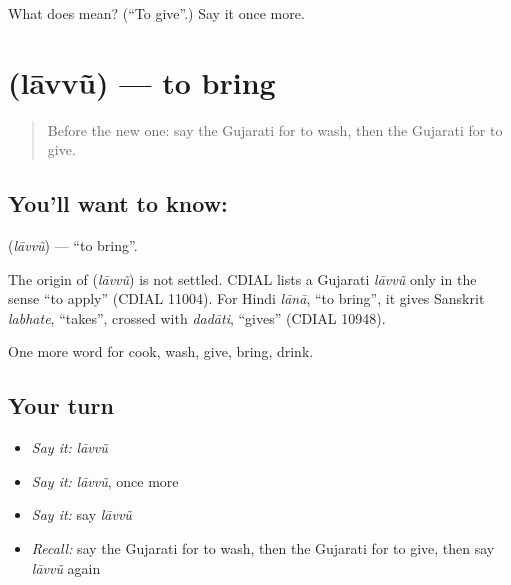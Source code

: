 \begin{tcolorbox}[breakable,colback=teal!4,colframe=teal!35!black,title={Before you move on}]
What does  mean? (\textquotedblleft{}To give\textquotedblright{}.) Say it once more.
\end{tcolorbox}
\section[\texorpdfstring{\gu{લાવવું} (lāvvũ)}{લાવવું (lāvvũ)}]{ (lāvvũ) — to bring}

\label{lesson:GU-C55-laavvu}



\begin{quote}
Before the new one: say the Gujarati for to wash, then the Gujarati for to give.
\end{quote}

\subsection*{You'll want to know: }
\textbf{} (\emph{lāvvũ}) — \textquotedblleft{}to bring\textquotedblright{}.

\begin{cousinweb}
The origin of \textbf{} (\emph{lāvvũ}) is not settled. CDIAL lists a Gujarati \emph{lāvvũ} only in the sense \textquotedblleft{}to apply\textquotedblright{} (CDIAL 11004). For Hindi \emph{lānā}, \textquotedblleft{}to bring\textquotedblright{}, it gives Sanskrit \emph{labhate}, \textquotedblleft{}takes\textquotedblright{}, crossed with \emph{dadāti}, \textquotedblleft{}gives\textquotedblright{} (CDIAL 10948).
\end{cousinweb}

\begin{grammarlens}[title={What you've built}]
One more word for cook, wash, give, bring, drink.
\end{grammarlens}

\subsection*{Your turn}
\begin{itemize}
\raggedright
  \item \emph{Say it:} \emph{lāvvũ}
  \item \emph{Say it:} \emph{lāvvũ}, once more
  \item \emph{Say it:} say \emph{lāvvũ}
  \item \emph{Recall:} say the Gujarati for to wash, then the Gujarati for to give, then say \emph{lāvvũ} again
\end{itemize}

